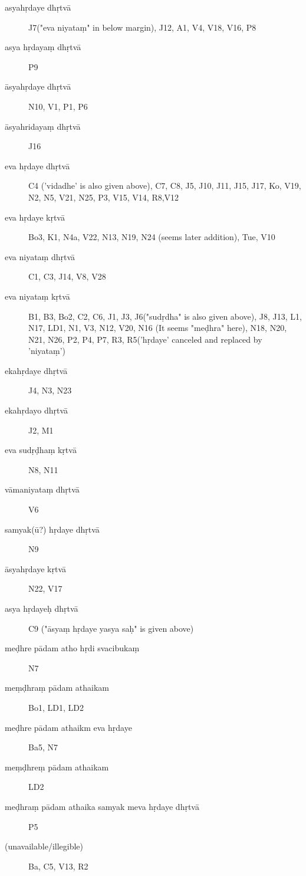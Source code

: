 \begin{ekdosis}
\begin{marma}[hp01_035]
  \begin{description}
\item[asyahṛdaye dhṛtvā]        J7("eva niyataṃ" in below margin), J12, A1, V4, V18, V16, P8
\item[asya hṛdayaṃ dhṛtvā]   P9
\item[āsyahṛdaye dhṛtvā]        N10, V1, P1, P6
\item[āsyahridayaṃ dhṛtvā]        J16
\item[eva hṛdaye dhṛtvā] C4 ('vidadhe' is also given above), C7, C8, J5, J10, J11, J15, J17, Ko,
 V19, N2, N5, V21, N25, P3, V15, V14, R8,V12
\item[eva hṛdaye kṛtvā]        Bo3, K1, N4a, V22, N13, N19, N24 (seems later addition), Tue, V10
\item[eva niyataṃ dhṛtvā]        C1, C3, J14, V8, V28
\item[eva niyataṃ kṛtvā] B1, B3, Bo2, C2, C6, J1, J3, J6("sudṛdha" is also given above), J8, J13,
 L1, N17, LD1, N1, V3, N12, V20, N16 (It seems "meḍhra" here), N18, N20, N21, N26, P2, P4, P7, R3,
 R5('hṛdaye' canceled and replaced by 'niyataṃ')
\item[ekahṛdaye dhṛtvā]        J4, N3, N23
\item[ekahṛdayo dhṛtvā]        J2, M1
\item[eva sudṛḍhaṃ kṛtvā]        N8, N11
\item[vāmaniyataṃ dhṛtvā]        V6
\item[samyak(ū?) hṛdaye dhṛtvā]        N9    
\item[āsyahṛdaye kṛtvā]        N22, V17
\item[asya hṛdayeḥ dhṛtvā]        C9 ("āsyaṃ hṛdaye yasya saḥ" is given above)
\item[meḍhre pādam atho hṛdi svacibukaṃ]        N7
\item[meṃḍhraṃ pādam athaikam]                Bo1, LD1, LD2
\item[meḍhre pādam athaikm eva hṛdaye]        Ba5, N7
\item[meṃḍhreṃ pādam athaikam]                LD2
\item[meḍhraṃ pādam athaika samyak meva hṛdaye dhṛtvā]               P5
\item[(unavailable/illegible)]        Ba, C5, V13, R2
        \end{description}
\end{marma}

   


\end{ekdosis}
